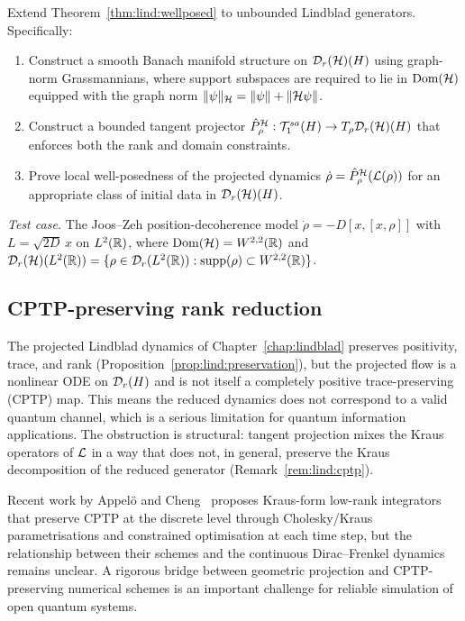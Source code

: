\begin{problem}
\label{prob:lindblad_unbounded}
Extend Theorem~\ref{thm:lind:wellposed} to unbounded Lindblad generators.
Specifically:
\begin{enumerate}
\item[\textup{(a)}] Construct a smooth Banach manifold structure on
    $\mathcal{D}_{r}(\mathcal{H})(H)$ using graph-norm Grassmannians, where support
    subspaces are required to lie in $\mathrm{Dom}(\mathcal{H})$ equipped with
    the graph norm $\|\psi\|_{\mathcal{H}} = \|\psi\| + \|\mathcal{H}\psi\|$.
\item[\textup{(b)}] Construct a bounded tangent projector
    $\hat P_\rho^{\mathcal{H}}: \mathcal{T}_{1}^{sa}(H) \to T_\rho \mathcal{D}_{r}(\mathcal{H})(H)$
    that enforces both the rank and domain constraints.
\item[\textup{(c)}] Prove local well-posedness of the projected dynamics
    $\dot\rho = \hat P_\rho^{\mathcal{H}}(\mathcal{L}(\rho))$ for an appropriate
    class of initial data in $\mathcal{D}_{r}(\mathcal{H})(H)$.
\end{enumerate}
\emph{Test case.} The Joos--Zeh position-decoherence model
$\dot\rho = -D[x,[x,\rho]]$ with $L = \sqrt{2D}\,x$ on $L^2(\mathbb{R})$,
where $\mathrm{Dom}(\mathcal{H}) = W^{2,2}(\mathbb{R})$ and
$\mathcal{D}_{r}(\mathcal{H})(L^2(\mathbb{R})) = \{\rho \in \mathcal{D}_{r}(L^2(\mathbb{R})) :
\mathrm{supp}(\rho) \subset W^{2,2}(\mathbb{R})\}$.
\end{problem}

\subsection*{CPTP-preserving rank reduction}

The projected Lindblad dynamics of Chapter~\ref{chap:lindblad}
preserves positivity, trace, and rank (Proposition~\ref{prop:lind:preservation}),
but the projected flow is a nonlinear ODE on $\mathcal{D}_{r}(H)$ and is
not itself a completely positive trace-preserving (CPTP) map.
This means the reduced dynamics does not correspond to a valid quantum
channel, which is a serious limitation for quantum information applications.
The obstruction is structural: tangent projection mixes the Kraus
operators of $\mathcal{L}$ in a way that does not, in general, preserve the
Kraus decomposition of the reduced generator
(Remark~\ref{rem:lind:cptp}).

Recent work by Appelö and Cheng~\cite{AppeloChengo2024} proposes
Kraus-form low-rank integrators that preserve CPTP at the discrete
level through Cholesky/Kraus parametrisations and constrained
optimisation at each time step, but the relationship between their
schemes and the continuous Dirac--Frenkel dynamics remains unclear.
A rigorous bridge between geometric projection and CPTP-preserving
numerical schemes is an important challenge for reliable simulation of
open quantum systems.

